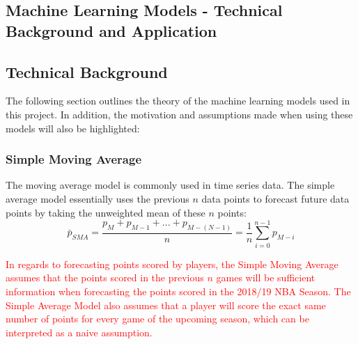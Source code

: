 \documentclass[a4paper,11pt,twoside]{article}
\begin{document}
\subsection{Machine Learning Models - Technical Background and Application} 

\subsection{Technical Background}
The following section outlines the theory of the machine learning models used in this project. In addition, the motivation and assumptions made when using these models will also be highlighted:


\subsubsection{Simple Moving Average}
The moving average model is commonly used in time series data. The simple average model essentially uses the previous $n$ data points to forecast future data points by taking the unweighted mean of these $n$ points:
\begin{equation}
\bar{p}_{SMA} = \frac{p_{M} + p_{M-1} + ... + p_{M-(N-1)}} {n} 
= \frac{1}{n} \sum_{i=0}^{n-1}p_{M-i}
\end{equation}

\textcolor{red}{In regards to forecasting points scored by players, the Simple Moving Average assumes that the points scored in the previous $n$ games will be sufficient information when forecasting the points scored in the 2018/19 NBA Season. The Simple Average Model also assumes that a player will score the exact same number of points for every game of the upcoming season, which can be interpreted as a naive assumption.}
\end{document}

